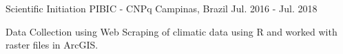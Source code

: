 \begin{cventries}
    \cventry
      {Scientific Initiation}
      {PIBIC - CNPq}
      {Campinas, Brazil}
      {Jul. 2016 - Jul. 2018}
      {
        \begin{cvitems}
          \item {Data Collection using Web Scraping of climatic data using R and worked with raster files in ArcGIS.}
        \end{cvitems}
      }
\end{cventries}